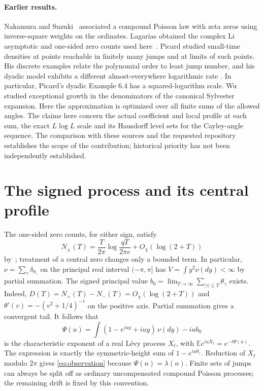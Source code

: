 \documentclass[11pt]{article}
\theoremstyle{remark}\newtheorem{remark}[theorem]{Remark}
\begin{document}
\paragraph{Earlier results.}
Nakamura and Suzuki~\cite{nakamura} associated a compound Poisson law
with zeta zeros using inverse-square weights on the ordinates.
Lagarias obtained the complex Li asymptotic and one-sided zero counts
used here~\cite{lagarias}. Picard studied small-time densities at points
reachable in finitely many jumps and at limits of such points. His
discrete examples relate the polynomial order to least jump number, and
his dyadic model exhibits a different almost-everywhere logarithmic rate
\cite{picard1,picard2}. In particular, Picard's dyadic Example 6.4
has a squared-logarithm scale. Wu~\cite{wu} studied exceptional growth in
the denominators of the canonical Sylvester expansion. Here the approximation
is optimized over all finite sums of the allowed angles. The claims here concern the actual coefficient
and local profile at each sum, the exact $L\log L$ scale and its Hausdorff level sets for the
Cayley-angle sequence. The comparison with these sources and the
requested repository establishes the scope of the contribution;
historical priority has not been independently established.

\section{The signed process and its central profile}\label{sec:central}
The one-sided zero counts, for either sign, satisfy
\begin{equation}\label{eq:zero-count}
 N_\pm(T)=\frac{T}{2\pi}\log\frac{qT}{2\pi e}+O_\chi(\log(2+T))
\end{equation}
by~\cite[Theorem 2.1(4)]{lagarias}; treatment of a central zero changes only
a bounded term. In particular, $\nu=\sum_\gamma\delta_{\theta_\gamma}$
on the principal real interval $(-\pi,\pi]$ has
$V=\int y^2\nu(dy)<\infty$ by partial summation. The signed principal
value $b_0=\lim_{T\to\infty}\sum_{|\gamma|\le T}\theta_\gamma$ exists.
Indeed, $D(T)=N_+(T)-N_-(T)=O_\chi(\log(2+T))$ and
$\theta'(v)=-(v^2+1/4)^{-1}$ on the positive axis. Partial summation gives
a convergent tail. It follows that
\[
 \Psi(u)=\int(1-e^{iuy}+iuy)\,\nu(dy)-iu b_0
\]
is the characteristic exponent of a real L\'evy process $X_t$, with
$\mathbb E e^{iuX_t}=e^{-t\Psi(u)}$. The expression is exactly the
symmetric-height sum of $1-e^{iu\theta_\gamma}$. Reduction of $X_t$ modulo
$2\pi$ gives \eqref{eq:observation} because $\Psi(n)=\lambda(n)$.
Finite sets of jumps can always be split off as ordinary uncompensated
compound Poisson processes; the remaining drift is fixed by this convention.
\end{document}
